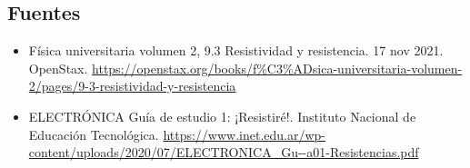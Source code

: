 \subsection{Fuentes}
\begin{itemize}

     \item Física universitaria volumen 2, 9.3 Resistividad y resistencia. 17 nov 2021. OpenStax. \url{https://openstax.org/books/f%C3%ADsica-universitaria-volumen-2/pages/9-3-resistividad-y-resistencia}
       \item ELECTRÓNICA Guía de estudio 1:
¡Resistiré!. Instituto Nacional de Educación Tecnológica. \url{https://www.inet.edu.ar/wp-content/uploads/2020/07/ELECTRONICA_Gu--a01-Resistencias.pdf}
    
    
\end{itemize}